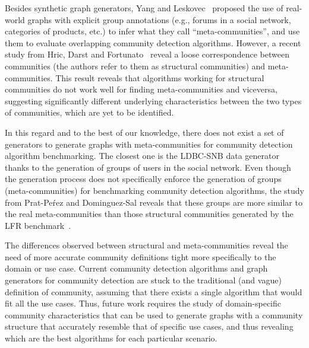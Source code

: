 Besides synthetic graph generators, Yang and Leskovec~\cite{yang2015defining} proposed the use of real-world graphs with explicit group annotations (e.g., forums in a social network, categories of products, etc.) to infer what they call ``meta-communities'', and use them to evaluate overlapping community detection algorithms. However, a recent study from Hric, Darst and Fortunato~\cite{hric2014community} reveal a loose correspondence between  communities (the authors refer to them as structural communities) and meta-communities.  This result reveals that  algorithms working for structural communities do not work well for finding meta-communities and viceversa, suggesting significantly different underlying characteristics between the two types of communities, which are yet to be identified.

In this regard and to the best of our knowledge, there does not exist a set of generators to generate graphs with meta-communities for community detection algorithm benchmarking. The closest one is the LDBC-SNB data generator~\cite{Erling:2015:LSN:2723372.2742786} thanks to the generation of groups of users in the social network. Even though the generation process does not specifically enforce the generation of groups (meta-communities) for benchmarking community detection algorithms, the study from Prat-Pe\'rez and Dominguez-Sal reveals that these groups are more similar to the real meta-communities than those structural communities generated by the LFR benchmark~\cite{Prat-Perez:2014:CSS:2621934.2621942}.

The differences observed between structural and meta-communities reveal the need of more accurate community definitions tight more specifically to the domain or use case. Current community detection algorithms and graph generators for community detection are stuck to the traditional (and vague) definition of community, assuming that there exists a single algorithm that would fit all the use cases. Thus, future work requires the study of domain-specific community characteristics that can be used to generate graphs with a community structure that accurately resemble that of specific use cases, and thus revealing which are the best algorithms for each particular scenario.

